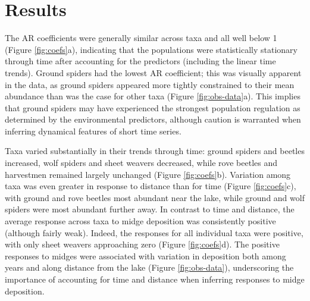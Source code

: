 \section*{Results}

The AR coefficients were generally similar across taxa and all well below 1
(Figure \ref{fig:coefs}a), 
indicating that the populations were statistically stationary
through time after accounting for the predictors (including the linear time trends).
Ground spiders had the lowest AR coefficient; 
this was visually apparent in the data,
as ground spiders appeared more tightly constrained to their mean abundance
than was the case for other taxa (Figure \ref{fig:obs-data}a).
This implies that ground spiders may have experienced the strongest population regulation
as determined by the environmental predictors,
although caution is warranted when inferring dynamical features of short time series.



Taxa varied substantially in their trends through time: 
ground spiders and beetles increased, wolf spiders and sheet weavers decreased,
while rove beetles and harvestmen remained largely unchanged (Figure \ref{fig:coefs}b).  
Variation among taxa was even greater in response to distance than for time (Figure \ref{fig:coefs}c),
with ground and rove beetles most abundant near the lake, 
while ground and wolf spiders were most abundant further away.
In contrast to time and distance,
the average response across taxa to midge deposition was consistently positive (although fairly weak).
Indeed, the responses for all individual taxa were positive, 
with only sheet weavers approaching zero (Figure \ref{fig:coefs}d).
The positive responses to midges were associated with variation in deposition 
both among years and along distance from the lake (Figure \ref{fig:obs-data}),
underscoring the importance of accounting for time and distance when inferring responses to midge deposition.



